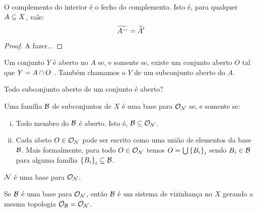 \begin{theorem}
	\label{thm:interior-fecho}
	O complemento do interior é o fecho do complemento. Isto é, para qualquer $A \subseteq X$, vale:
	\[
		\widetilde{A^{\smile}} = \widetilde{A}^{\prime}
	\]
\end{theorem}

\begin{proof}
	A fazer...
\end{proof}

\begin{definition}
	\label{def:subconjunto-aberto}
	Um conjunto $Y$ é aberto no $A$ se, e somente se, existe um conjunto aberto $O$ tal que $Y = A \cap O$ . Também chamamos o $Y$ de um subconjunto aberto do $A$.
\end{definition}

\begin{question}
	Todo subconjunto aberto de um conjunto é aberto?
\end{question}

\begin{definition}[Base]
	\label{def:base}
	Uma família $\mathcal{B}$ de subconjuntos de $X$ é uma base para $\mathcal{O}_{\mathcal{N}}$ se, e somente se:
	\begin{enumerate}[i)]
		\item Todo membro do $\mathcal{B}$ é aberto. Isto é, $\mathcal{B} \subseteq \mathcal{O}_{\mathcal{N}}$.
		\item Cada abeto $O \in \mathcal{O}_{\mathcal{N}}$ pode ser escrito como uma união de elementos da base $\mathcal{B}$. Mais formalmente, para todo $O \in \mathcal{O}_{\mathcal{N}}$ temos $O = \bigcup \left\{B_{i}\right\}_{i}$ sendo $B_i \in \mathcal{B}$ para alguma família $\left\{B_{i}\right\}_{i} \subseteq \mathcal{B}$.
	\end{enumerate}
\end{definition}

\begin{fact}
	$\mathcal{N}$ é uma base para $\mathcal{O}_{\mathcal{N}}$.
\end{fact}

\begin{theorem}
	Se $\mathcal{B}$ é uma base para $\mathcal{O}_{\mathcal{N}}$, então $\mathcal{B}$ é um sistema de vizinhança no $X$ gerando a mesma topologia $\mathcal{O}_{\mathcal{B}} = \mathcal{O}_{\mathcal{N}}$.
\end{theorem}

